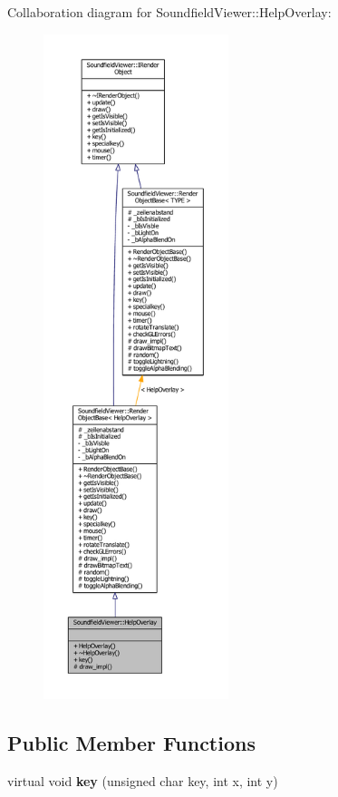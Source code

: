 Collaboration diagram for Soundfield\-Viewer\-:\-:Help\-Overlay\-:\nopagebreak
\begin{figure}[H]
\begin{center}
\leavevmode
\includegraphics[height=550pt]{dd/db7/classSoundfieldViewer_1_1HelpOverlay__coll__graph}
\end{center}
\end{figure}
\subsection*{Public Member Functions}
\begin{DoxyCompactItemize}
\item 
virtual void {\bfseries key} (unsigned char key, int x, int y)\label{classSoundfieldViewer_1_1HelpOverlay_a14530d6f0eb1fe2b13641b8ac041fec9}

\end{DoxyCompactItemize}

